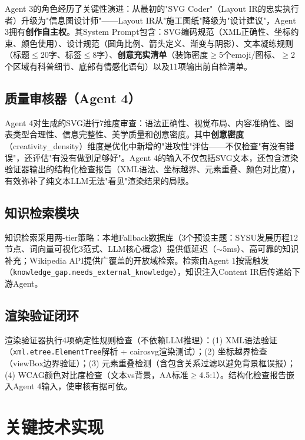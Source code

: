 \documentclass[11pt,a4paper]{article}
\begin{document}
Agent 3的角色经历了关键性演进：从最初的"SVG Coder"（Layout IR的忠实执行者）升级为"信息图设计师"——Layout IR从"施工图纸"降级为"设计建议"，Agent 3拥有\textbf{创作自主权}。其System Prompt包含：SVG编码规范（XML正确性、坐标约束、颜色使用）、设计规范（圆角比例、箭头定义、渐变与阴影）、文本凝练规则（标题$\le$20字、标签$\le$8字）、\textbf{创意充实清单}（装饰密度$\ge$5个emoji/图标、$\ge$2个区域有科普细节、底部有情感化语句）以及11项输出前自检清单。

\subsection{质量审核器（Agent 4）}

Agent 4对生成的SVG进行7维度审查：语法正确性、视觉布局、内容准确性、图表类型合理性、信息完整性、美学质量和创意密度。其中\textbf{创意密度}（creativity\_density）维度是优化中新增的"进攻性"评估——不仅检查"有没有错误"，还评估"有没有做到足够好"。Agent 4的输入不仅包括SVG文本，还包含渲染验证器输出的结构化检查报告（XML语法、坐标越界、元素重叠、颜色对比度），有效弥补了纯文本LLM无法"看见"渲染结果的局限。

\subsection{知识检索模块}

知识检索采用两-tier策略：本地Fallback数据库（3个预设主题：SYSU发展历程12节点、词向量可视化3范式、LLM核心概念）提供低延迟（$\sim$5ms）、高可靠的知识补充；Wikipedia API提供广覆盖的开放域检索。检索由Agent 1按需触发（\texttt{knowledge\_gap.needs\_external\_knowledge}），知识注入Content IR后传递给下游Agent。

\subsection{渲染验证闭环}

渲染验证器执行4项确定性规则检查（不依赖LLM推理）：(1) XML语法验证（\texttt{xml.etree.ElementTree}解析 + cairosvg渲染测试\cite{cairosvg}）；(2) 坐标越界检查（viewBox边界验证）；(3) 元素重叠检测（含包含关系过滤以避免背景框误报）；(4) WCAG颜色对比度检查（文本vs背景，AA标准$\ge$4.5:1）。结构化检查报告嵌入Agent 4输入，使审核有据可依。

\section{关键技术实现}
\end{document}

